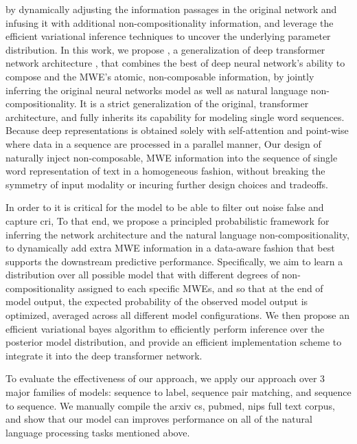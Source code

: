 by dynamically adjusting the information passages in the original network and infusing it with additional non-compositionality information, and leverage the efficient variational inference techniques to uncover the underlying parameter  distribution. 
In this work, 
we propose \BertMWE, a generalization of deep transformer network architecture \cite{vaswani2017attention}, 
that combines the best of deep neural network's ability to compose and the  MWE's atomic, non-composable information, 
by jointly inferring the original neural networks model as well as
natural language non-compositionality.
It is a strict generalization of the original, transformer architecture,
and fully inherits its capability for modeling single word sequences.  
Because deep representations is obtained solely with self-attention and point-wise where data in a sequence are processed in a parallel manner, Our design of \BertMWE naturally inject non-composable, MWE information into the sequence of single word representation of text in a homogeneous fashion, without breaking the symmetry of input modality or incuring further design choices and tradeoffs.


In order to 
it is critical for the model to be able to filter out noise false and capture cri, 
To that end, we propose a principled probabilistic framework for inferring the network architecture and the natural language non-compositionality, 
to dynamically add extra MWE information in a data-aware fashion
that best supports the downstream predictive performance. 
Specifically, we aim to learn a distribution over all possible model that with different degrees of non-compositionality assigned to each specific MWEs, and so that at the end of model output, the expected probability of the observed model output is optimized, averaged across all different model configurations.
We then propose an efficient variational bayes algorithm to efficiently perform inference over the posterior model distribution, and provide an efficient implementation scheme to integrate it into the deep transformer network. 


To evaluate the effectiveness of our approach, we apply our approach over 3 major families of models: sequence to label, sequence pair matching, and sequence to sequence. We manually compile the arxiv cs, pubmed, nips full text corpus, and show that our model can improves performance on all of the natural language processing tasks mentioned above.


